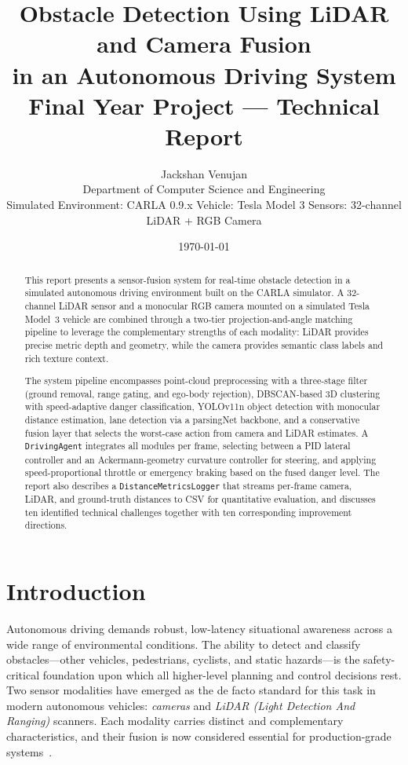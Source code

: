 \documentclass[12pt,a4paper]{article}
\title{%
  \textbf{Obstacle Detection Using LiDAR and Camera Fusion\\
  in an Autonomous Driving System}\\[0.6em]
  \large Final Year Project --- Technical Report
}
\author{%
  Jackshan Venujan\\
  Department of Computer Science and Engineering\\[0.3em]
  \small Simulated Environment: CARLA 0.9.x \textbar{}
         Vehicle: Tesla Model 3 \textbar{}
         Sensors: 32-channel LiDAR + RGB Camera
}
\date{\today}
\begin{document}
\maketitle
\thispagestyle{fancy}

\begin{abstract}
This report presents a sensor-fusion system for real-time obstacle detection
in a simulated autonomous driving environment built on the CARLA simulator.
A 32-channel LiDAR sensor and a monocular RGB camera mounted on a simulated
Tesla Model~3 vehicle are combined through a two-tier projection-and-angle
matching pipeline to leverage the complementary strengths of each modality:
LiDAR provides precise metric depth and geometry, while the camera provides
semantic class labels and rich texture context.

The system pipeline encompasses point-cloud preprocessing with a three-stage
filter (ground removal, range gating, and ego-body rejection), DBSCAN-based
3D clustering with speed-adaptive danger classification, YOLOv11n object
detection with monocular distance estimation, lane detection via a parsingNet
backbone, and a conservative fusion layer that selects the worst-case action
from camera and LiDAR estimates.  A \texttt{DrivingAgent} integrates all
modules per frame, selecting between a PID lateral controller and an
Ackermann-geometry curvature controller for steering, and applying
speed-proportional throttle or emergency braking based on the fused danger
level.  The report also describes a \texttt{DistanceMetricsLogger} that
streams per-frame camera, LiDAR, and ground-truth distances to CSV for
quantitative evaluation, and discusses ten identified technical challenges
together with ten corresponding improvement directions.
\end{abstract}

\tableofcontents
\newpage

\section{Introduction}
\label{sec:intro}

Autonomous driving demands robust, low-latency situational awareness across a
wide range of environmental conditions.  The ability to detect and classify
obstacles---other vehicles, pedestrians, cyclists, and static hazards---is the
safety-critical foundation upon which all higher-level planning and control
decisions rest.  Two sensor modalities have emerged as the de facto standard
for this task in modern autonomous vehicles: \emph{cameras} and
\emph{LiDAR (Light Detection And Ranging)} scanners.  Each modality carries
distinct and complementary characteristics, and their fusion is now considered
essential for production-grade systems~\cite{geiger2012kitti,chen2017mv3d}.
\end{document}
